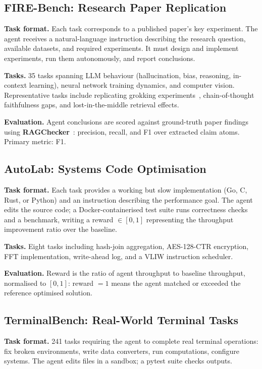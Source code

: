 \documentclass{article}
\begin{document}
\subsection{FIRE-Bench: Research Paper Replication}

\textbf{Task format.}
Each task corresponds to a published paper's key experiment.
The agent receives a natural-language instruction describing the research question, available datasets, and required experiments.
It must design and implement experiments, run them autonomously, and report conclusions.

\textbf{Tasks.}
35 tasks spanning LLM behaviour (hallucination, bias, reasoning, in-context learning), neural network training dynamics, and computer vision.
Representative tasks include replicating grokking experiments~\cite{grokking}, chain-of-thought faithfulness gaps, and lost-in-the-middle retrieval effects.

\textbf{Evaluation.}
Agent conclusions are scored against ground-truth paper findings using \textbf{RAGChecker}~\cite{ragchecker}: precision, recall, and F1 over extracted claim atoms.
Primary metric: F1.

\subsection{AutoLab: Systems Code Optimisation}

\textbf{Task format.}
Each task provides a working but slow implementation (Go, C, Rust, or Python) and an instruction describing the performance goal.
The agent edits the source code; a Docker-containerised test suite runs correctness checks and a benchmark, writing a reward $\in [0,1]$ representing the throughput improvement ratio over the baseline.

\textbf{Tasks.}
Eight tasks including hash-join aggregation, AES-128-CTR encryption, FFT implementation, write-ahead log, and a VLIW instruction scheduler.

\textbf{Evaluation.}
Reward is the ratio of agent throughput to baseline throughput, normalised to $[0,1]$: reward $= 1$ means the agent matched or exceeded the reference optimised solution.

\subsection{TerminalBench: Real-World Terminal Tasks}

\textbf{Task format.}
241 tasks requiring the agent to complete real terminal operations: fix broken environments, write data converters, run computations, configure systems.
The agent edits files in a sandbox; a pytest suite checks outputs.
\end{document}
